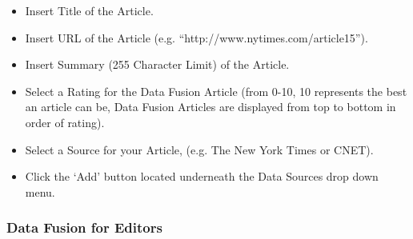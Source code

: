 \documentclass[10pt]{article} %
\begin{document}
\begin{itemize}
\begin{itemize}
	\item Insert Title of the Article.
	\item Insert URL of the Article (e.g. “http://www.nytimes.com/article15”).
	\item Insert Summary (255 Character Limit) of the Article.
	\item Select a Rating for the Data Fusion Article (from 0-10, 10 represents the best an article can be, Data Fusion Articles are displayed from top to bottom in order of rating).
	\item Select a Source for your Article, (e.g. The New York Times or CNET).   
	\item Click the ‘Add’ button located underneath the Data Sources drop down menu.
	\end{itemize}
\end{itemize}

\subsubsection{Data Fusion for Editors}
\end{document}
